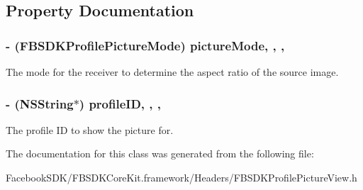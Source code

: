 \subsection{Property Documentation}
\hypertarget{interface_f_b_s_d_k_profile_picture_view_a81338c394b7aaf54cd76824f6530e4ea}{
\subsubsection[{picture\-Mode}]{\setlength{\rightskip}{0pt plus 5cm}-\/ (F\-B\-S\-D\-K\-Profile\-Picture\-Mode) picture\-Mode\hspace{0.3cm}{\ttfamily [read]}, {\ttfamily [write]}, {\ttfamily [nonatomic]}, {\ttfamily [assign]}}}\label{interface_f_b_s_d_k_profile_picture_view_a81338c394b7aaf54cd76824f6530e4ea}
The mode for the receiver to determine the aspect ratio of the source image. \hypertarget{interface_f_b_s_d_k_profile_picture_view_a1b4fb53fb08bb34d83f83d28d3733571}{
\subsubsection[{profile\-I\-D}]{\setlength{\rightskip}{0pt plus 5cm}-\/ (N\-S\-String$\ast$) profile\-I\-D\hspace{0.3cm}{\ttfamily [read]}, {\ttfamily [write]}, {\ttfamily [nonatomic]}, {\ttfamily [copy]}}}\label{interface_f_b_s_d_k_profile_picture_view_a1b4fb53fb08bb34d83f83d28d3733571}
The profile I\-D to show the picture for. 

The documentation for this class was generated from the following file\-:\begin{DoxyCompactItemize}
\item 
Facebook\-S\-D\-K/\-F\-B\-S\-D\-K\-Core\-Kit.\-framework/\-Headers/F\-B\-S\-D\-K\-Profile\-Picture\-View.\-h\end{DoxyCompactItemize}
